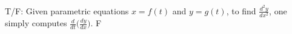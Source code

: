 {T/F: Given parametric equations $x=f(t)$ and $y=g(t)$, to find $\frac{d^2y}{dx^2}$, one simply computes $\frac{d}{dt}\Big(\frac{dy}{dx}\Big).$}
{F}
